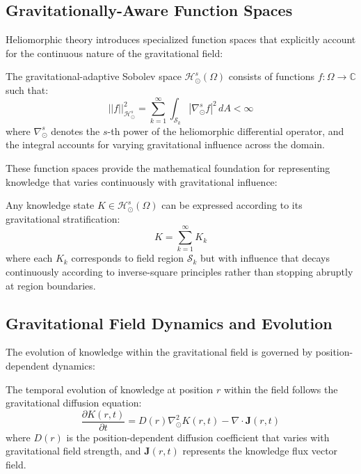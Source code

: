 \begin{definition}
\begin{theorem}
\subsection{Gravitationally-Aware Function Spaces}

Heliomorphic theory introduces specialized function spaces that explicitly account for the continuous nature of the gravitational field:

\begin{definition}
The gravitational-adaptive Sobolev space $\mathcal{H}_{\odot}^s(\Omega)$ consists of functions $f: \Omega \rightarrow \mathbb{C}$ such that:
\begin{equation}
||f||_{\mathcal{H}_{\odot}^s}^2 = \sum_{k=1}^{\infty} \int_{\mathcal{S}_k} |\nabla_{\odot}^s f|^2 \, dA < \infty
\end{equation}
where $\nabla_{\odot}^s$ denotes the $s$-th power of the heliomorphic differential operator, and the integral accounts for varying gravitational influence across the domain.
\end{definition}

These function spaces provide the mathematical foundation for representing knowledge that varies continuously with gravitational influence:

\begin{theorem}
Any knowledge state $K \in \mathcal{H}_{\odot}^s(\Omega)$ can be expressed according to its gravitational stratification:
\begin{equation}
K = \sum_{k=1}^{\infty} K_k
\end{equation}
where each $K_k$ corresponds to field region $\mathcal{S}_k$ but with influence that decays continuously according to inverse-square principles rather than stopping abruptly at region boundaries.
\end{theorem}

\subsection{Gravitational Field Dynamics and Evolution}

The evolution of knowledge within the gravitational field is governed by position-dependent dynamics:

\begin{proposition}
The temporal evolution of knowledge at position $r$ within the field follows the gravitational diffusion equation:
\begin{equation}
\frac{\partial K(r,t)}{\partial t} = D(r) \nabla_{\odot}^2 K(r,t) - \nabla \cdot \mathbf{J}(r,t)
\end{equation}
where $D(r)$ is the position-dependent diffusion coefficient that varies with gravitational field strength, and $\mathbf{J}(r,t)$ represents the knowledge flux vector field.
\end{proposition}


\end{theorem}
\end{definition}
